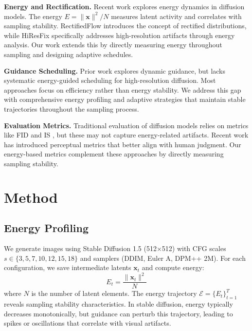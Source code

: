 \documentclass[10pt,twocolumn]{article}
\begin{document}
\textbf{Energy and Rectification.} Recent work \cite{song2023rectifiedflow,wang2023hiresfix,brock2018large} explores energy dynamics in diffusion models. The energy $E = \|\mathbf{x}\|^2/N$ measures latent activity and correlates with sampling stability. RectifiedFlow introduces the concept of rectified distributions, while HiResFix specifically addresses high-resolution artifacts through energy analysis. Our work extends this by directly measuring energy throughout sampling and designing adaptive schedules.

\textbf{Guidance Scheduling.} Prior work \cite{liu2023more,li2023guidance,esser2021imagebart} explores dynamic guidance, but lacks systematic energy-guided scheduling for high-resolution diffusion. Most approaches focus on efficiency rather than energy stability. We address this gap with comprehensive energy profiling and adaptive strategies that maintain stable trajectories throughout the sampling process.

\textbf{Evaluation Metrics.} Traditional evaluation of diffusion models relies on metrics like FID \cite{heusel2017gans} and IS \cite{radford2015unsupervised}, but these may not capture energy-related artifacts. Recent work \cite{zhang2018unreasonable,wang2004image} has introduced perceptual metrics that better align with human judgment. Our energy-based metrics complement these approaches by directly measuring sampling stability.

\section{Method}
\subsection{Energy Profiling}
We generate images using Stable Diffusion 1.5 (512$\times$512) with CFG scales $s \in \{3, 5, 7, 10, 12, 15, 18\}$ and samplers (DDIM, Euler A, DPM++ 2M). For each configuration, we save intermediate latents $\mathbf{x}_t$ and compute energy:
\begin{equation}
E_t = \frac{\|\mathbf{x}_t\|^2}{N}
\end{equation}
where $N$ is the number of latent elements. The energy trajectory $\mathcal{E} = \{E_t\}_{t=1}^T$ reveals sampling stability characteristics. In stable diffusion, energy typically decreases monotonically, but guidance can perturb this trajectory, leading to spikes or oscillations that correlate with visual artifacts.
\end{document}
